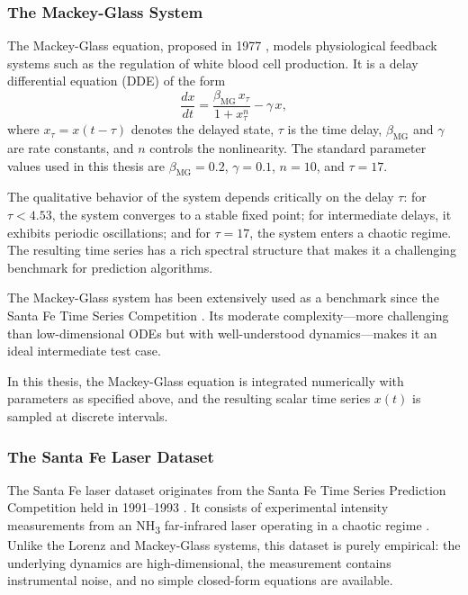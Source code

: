 \subsubsection{The Mackey-Glass System}
\label{sec:mackeyglass}

The Mackey-Glass equation, proposed in 1977 \cite{mackeyglass1977}, models physiological feedback systems such as the regulation of white blood cell production. It is a delay differential equation (DDE) of the form
\begin{equation}
    \frac{dx}{dt} = \frac{\beta_{\text{MG}} \, x_\tau}{1 + x_\tau^n} - \gamma \, x,
    \label{eq:mackeyglass}
\end{equation}
where $x_\tau = x(t - \tau)$ denotes the delayed state, $\tau$ is the time delay, $\beta_{\text{MG}}$ and $\gamma$ are rate constants, and $n$ controls the nonlinearity. The standard parameter values used in this thesis are $\beta_{\text{MG}} = 0.2$, $\gamma = 0.1$, $n = 10$, and $\tau = 17$.

The qualitative behavior of the system depends critically on the delay $\tau$: for $\tau < 4.53$, the system converges to a stable fixed point; for intermediate delays, it exhibits periodic oscillations; and for $\tau = 17$, the system enters a chaotic regime. The resulting time series has a rich spectral structure that makes it a challenging benchmark for prediction algorithms.

The Mackey-Glass system has been extensively used as a benchmark since the Santa Fe Time Series Competition \cite{weigend1994time}. Its moderate complexity---more challenging than low-dimensional ODEs but with well-understood dynamics---makes it an ideal intermediate test case.

In this thesis, the Mackey-Glass equation is integrated numerically with parameters as specified above, and the resulting scalar time series $x(t)$ is sampled at discrete intervals.

\subsubsection{The Santa Fe Laser Dataset}
\label{sec:santafe}

The Santa Fe laser dataset originates from the Santa Fe Time Series Prediction Competition held in 1991--1993 \cite{weigend1994time}. It consists of experimental intensity measurements from an NH\textsubscript{3} far-infrared laser operating in a chaotic regime \cite{hubner1989dimensions}. Unlike the Lorenz and Mackey-Glass systems, this dataset is purely empirical: the underlying dynamics are high-dimensional, the measurement contains instrumental noise, and no simple closed-form equations are available.

